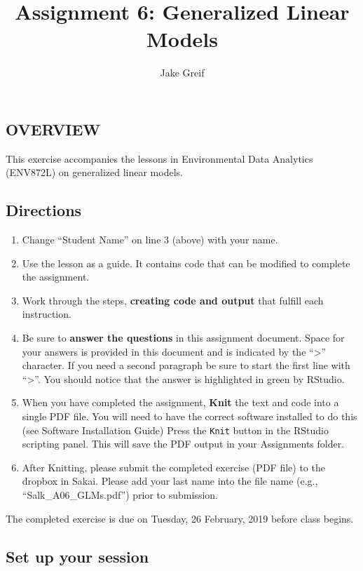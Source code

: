 \documentclass[]{article}
\title{Assignment 6: Generalized Linear Models}
\author{Jake Greif}
\date{}
\providecommand{\tightlist}{%
  \setlength{\itemsep}{0pt}\setlength{\parskip}{0pt}}
\begin{document}
\maketitle

\subsection{OVERVIEW}\label{overview}

This exercise accompanies the lessons in Environmental Data Analytics
(ENV872L) on generalized linear models.

\subsection{Directions}\label{directions}

\begin{enumerate}
\def\labelenumi{\arabic{enumi}.}
\tightlist
\item
  Change ``Student Name'' on line 3 (above) with your name.
\item
  Use the lesson as a guide. It contains code that can be modified to
  complete the assignment.
\item
  Work through the steps, \textbf{creating code and output} that fulfill
  each instruction.
\item
  Be sure to \textbf{answer the questions} in this assignment document.
  Space for your answers is provided in this document and is indicated
  by the ``\textgreater{}'' character. If you need a second paragraph be
  sure to start the first line with ``\textgreater{}''. You should
  notice that the answer is highlighted in green by RStudio.
\item
  When you have completed the assignment, \textbf{Knit} the text and
  code into a single PDF file. You will need to have the correct
  software installed to do this (see Software Installation Guide) Press
  the \texttt{Knit} button in the RStudio scripting panel. This will
  save the PDF output in your Assignments folder.
\item
  After Knitting, please submit the completed exercise (PDF file) to the
  dropbox in Sakai. Please add your last name into the file name (e.g.,
  ``Salk\_A06\_GLMs.pdf'') prior to submission.
\end{enumerate}

The completed exercise is due on Tuesday, 26 February, 2019 before class
begins.

\subsection{Set up your session}\label{set-up-your-session}
\end{document}
